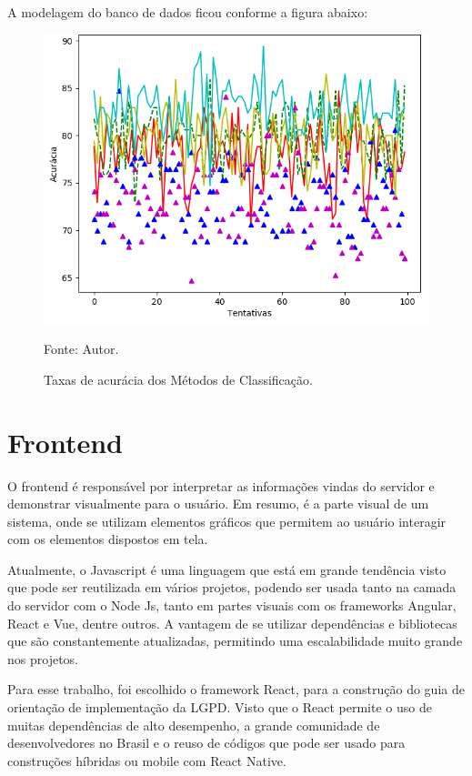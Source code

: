 \documentclass[
	12pt,				%
	openright,			%
	oneside,			%
	a4paper,			%
	english,			%
	french,				%
	spanish,			%
	brazil,				%
	]{abntex2}
\begin{document}
A modelagem do banco de dados ficou conforme a figura abaixo:

\begin{figure}[ht]
    \centering
    \caption{Taxas de acurácia dos Métodos de Classificação.}
    \includegraphics[width=5.0in]{Images/acc-classification.png}
    \label{fig: grafico-acc}
    
    \centering \small Fonte: Autor.
\end{figure}

\section{Frontend}

O frontend é responsável por interpretar as informações vindas do servidor e demonstrar visualmente para o usuário. Em resumo, é a parte visual de um sistema, onde se utilizam elementos gráficos que permitem ao usuário interagir com os elementos dispostos em tela.

Atualmente, o Javascript é uma linguagem que está em grande tendência visto que pode ser reutilizada em vários projetos, podendo ser usada tanto na camada do servidor com o Node Js, tanto em partes visuais com os frameworks Angular, React e Vue, dentre outros. A vantagem de se utilizar dependências e bibliotecas que são constantemente atualizadas, permitindo uma escalabilidade muito grande nos projetos.

Para esse trabalho, foi escolhido o framework React, para a construção do guia de orientação de implementação da LGPD. Visto que o React permite o uso de muitas dependências de alto desempenho, a grande comunidade de desenvolvedores no Brasil e o reuso de códigos que pode ser usado para construções híbridas ou mobile com React Native.
\end{document}

